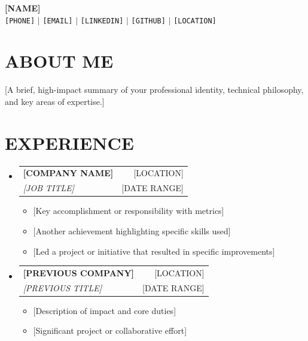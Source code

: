 \documentclass[letterpaper,11pt]{article}
\makeatletter
\newcommand{\entry}[1]{
  \item\small{
    {#1 \vspace{-1pt}}
  }
}
\newcommand{\sectionHeader}[4]{
  \vspace{-1pt}\item
    \begin{tabular*}{\textwidth}[t]{l@{\extracolsep{\fill}}r}
      \textbf{#1} & {\color{dark-grey}\small #2}\vspace{1pt}\\
      \textit{#3} & {\color{dark-grey} \small #4}\\
    \end{tabular*}\vspace{-4pt}
}
\newcommand{\sectionListStart}{\begin{itemize}[leftmargin=0in, label={}]}
\newcommand{\sectionListEnd}{\end{itemize}}
\newcommand{\itemListStart}{\begin{itemize}}
\newcommand{\itemListEnd}{\end{itemize}\vspace{0pt}}
\makeatother
\begin{document}
\begin{center}
  \textbf{\Huge [NAME]} \\ \vspace{5pt}
  \small \faPhone* \texttt{[PHONE]} \hspace{1pt} $|$
  \hspace{1pt} \faEnvelope \hspace{2pt} \texttt{[EMAIL]} \hspace{1pt} $|$
  \hspace{1pt} \faLinkedin \hspace{2pt} \texttt{[LINKEDIN]} \hspace{1pt} $|$
  \hspace{1pt} \faGithub \hspace{2pt} \texttt{[GITHUB]} \hspace{1pt} $|$
  \hspace{1pt} \faMapMarker* \hspace{2pt}\texttt{[LOCATION]}
  \\ \vspace{-3pt}
\end{center}


\section{ABOUT ME}
\begin{itemize}[leftmargin=0in, label={}]
  \small{\item{
        [A brief, high-impact summary of your professional identity, technical philosophy, and key areas of expertise.]
        }}
\end{itemize}

\section{EXPERIENCE}
\sectionListStart
\sectionHeader
{[COMPANY NAME]}{[LOCATION]}
{[JOB TITLE]}{[DATE RANGE]}
\itemListStart
\entry{[Key accomplishment or responsibility with metrics]}
\entry{[Another achievement highlighting specific skills used]}
\entry{[Led a project or initiative that resulted in specific improvements]}
\itemListEnd

\sectionHeader
{[PREVIOUS COMPANY]}{[LOCATION]}
{[PREVIOUS TITLE]}{[DATE RANGE]}
\itemListStart
\entry{[Description of impact and core duties]}
\entry{[Significant project or collaborative effort]}
\itemListEnd
\sectionListEnd
\end{document}
